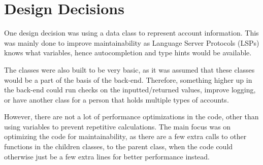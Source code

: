 \documentclass[11pt,british]{article}
\begin{document}
\section*{Design Decisions}

One design decision was using a data class to represent account information.
This was mainly done to improve maintainability as Language Server Protocols (LSPs)
knows what variables, hence autocompletion and type hints would be available.

The classes were also built to be very basic, as it was assumed that
these classes would be a part of the basis of the back-end.
Therefore, something higher up in the back-end could run checks on the inputted\slash returned
values, improve logging, or have another class for a person that holds multiple
types of accounts.

However, there are not a lot of performance optimizations in the code, other than
using variables to prevent repetitive calculations. The main focus was on optimizing
the code for maintainability, as there are a few extra calls to other functions in
the children classes, to the parent class, when the code could otherwise just be a few extra lines
for better performance instead.
\end{document}
